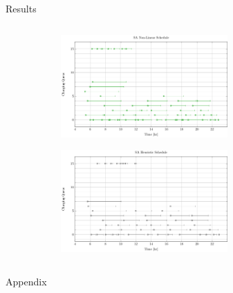 \documentclass[aspectratio=169]{beamer}
\begin{document}
\begin{frame}[label={sec:orgd6f6eb1}]{Results}
\begin{columns}
\begin{column}{0.5\columnwidth}
\begin{figure}
\begin{subfigure}[t]{\textwidth}
\centering
    \includegraphics[width=0.7\textwidth]{img/sa-nonlinear/schedule-sa-nonlinear}
\end{subfigure}
\begin{subfigure}[t]{\textwidth}
\centering
    \includegraphics[width=0.7\textwidth]{img/sa-pap-paper-good/schedule-sa-heuristic}
\end{subfigure}
\end{figure}
\end{column}
\end{columns}
\end{frame}

\appendix
\begin{frame}[label={sec:orgebaee18}]{Appendix}
\end{frame}
\end{document}

